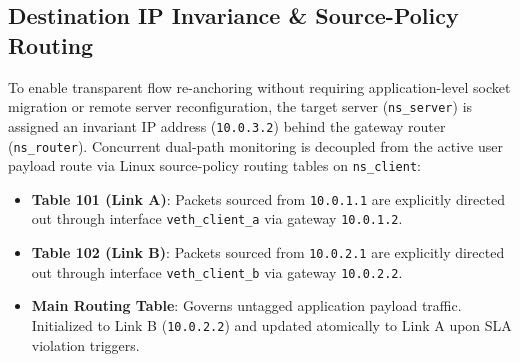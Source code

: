 \documentclass[conference]{IEEEtran}
\begin{document}
\textcolor{extensioncolor}{
\subsection{Destination IP Invariance \& Source-Policy Routing}
To enable transparent flow re-anchoring without requiring application-level socket migration or remote server reconfiguration, the target server (\texttt{ns\_server}) is assigned an invariant IP address (\texttt{10.0.3.2}) behind the gateway router (\texttt{ns\_router}). Concurrent dual-path monitoring is decoupled from the active user payload route via Linux source-policy routing tables on \texttt{ns\_client}:
\begin{itemize}
    \item \textbf{Table 101 (Link A)}: Packets sourced from \texttt{10.0.1.1} are explicitly directed out through interface \texttt{veth\_client\_a} via gateway \texttt{10.0.1.2}.
    \item \textbf{Table 102 (Link B)}: Packets sourced from \texttt{10.0.2.1} are explicitly directed out through interface \texttt{veth\_client\_b} via gateway \texttt{10.0.2.2}.
    \item \textbf{Main Routing Table}: Governs untagged application payload traffic. Initialized to Link B (\texttt{10.0.2.2}) and updated atomically to Link A upon SLA violation triggers.
\end{itemize}

}
\end{document}
